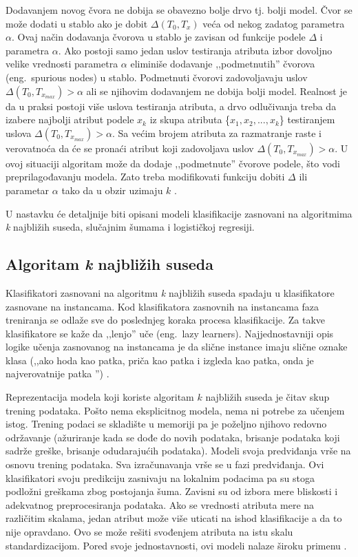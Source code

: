 \documentclass[12pt,oneside]{memoir}
\begin{document}
\begin{description}
Dodavanjem novog čvora ne dobija se obavezno bolje drvo tj. bolji model. Čvor se može dodati u stablo ako je dobit $\Delta(T_0, T_x)$ veća od nekog zadatog parametra $\alpha$. Ovaj način dodavanja čvorova u stablo je zavisan od funkcije podele $\Delta$ i parametra $\alpha$. Ako postoji samo jedan uslov testiranja atributa izbor dovoljno velike vrednosti parametra $\alpha$ eliminiše dodavanje ,,podmetnutih'' čvorova (eng.~spurious nodes) u stablo. Podmetnuti čvorovi zadovoljavaju uslov $\Delta(T_0, T_{x_{max}})>\alpha$ ali se njihovim dodavanjem ne dobija bolji model. Realnost je da u praksi postoji više uslova testiranja atributa, a drvo odlučivanja treba da izabere najbolji atribut podele $x_k$ iz skupa atributa \{$x_1, x_2,...,x_k$\} testiranjem uslova $\Delta(T_0, T_{x_{max}})>\alpha$. Sa većim brojem atributa za razmatranje raste i verovatnoća da će se pronaći atribut koji zadovoljava uslov $\Delta(T_0, T_{x_{max}})>\alpha$. U ovoj situaciji algoritam može da dodaje ,,podmetnute'' čvorove podele, što vodi preprilagođavanju modela. Zato treba modifikovati funkciju dobiti $\Delta$ ili parametar $\alpha$ tako da u obzir uzimaju $k$  \cite{mitic}.
\end{description}

U nastavku će detaljnije biti opisani modeli klasifikacije zasnovani na algoritmima \textit{k} najbližih suseda, 
slučajnim šumama i logističkoj regresiji.

\subsection{Algoritam \textit{k} najbližih suseda}

Klasifikatori zasnovani na algoritmu \textit{k} najbližih suseda spadaju u klasifikatore zasnovane na instancama. Kod klasifikatora zasnovnih na instancama faza treniranja se odlaže sve do poslednjeg koraka procesa klasifikacije. Za takve klasifikatore se kaže da ,,lenjo'' uče (eng.~lazy learners). Najjednostavniji opis logike učenja zasnovanog na instancama je da slične instance imaju slične oznake klasa (,,ako hoda kao patka, priča kao patka i izgleda kao patka, onda je najverovatnije patka \cite{mitic}'') \cite{aggarwal}.

Reprezentacija modela koji koriste algoritam $k$ najbližih suseda je čitav skup trening podataka. Pošto nema eksplicitnog modela, nema ni potrebe za učenjem istog. Trening podaci se skladište u memoriji pa je poželjno njihovo redovno održavanje (ažuriranje kada se dođe do novih podataka, brisanje podataka koji sadrže greške, brisanje odudarajućih podataka). Modeli svoja predviđanja vrše na osnovu trening podataka. Sva izračunavanja vrše se u fazi predviđanja. Ovi klasifikatori svoju predikciju zasnivaju na lokalnim podacima pa su stoga podložni greškama zbog postojanja šuma. Zavisni su od izbora mere bliskosti i adekvatnog preprocesiranja podataka. Ako se vrednosti atributa mere na različitim skalama, jedan atribut može više uticati na ishod klasifikacije a da to nije opravdano. Ovo se može rešiti svođenjem atributa na istu skalu standardizacijom. Pored svoje jednostavnosti, ovi modeli nalaze široku primenu \cite{mlm, mladen, mitic}.
\end{document}
